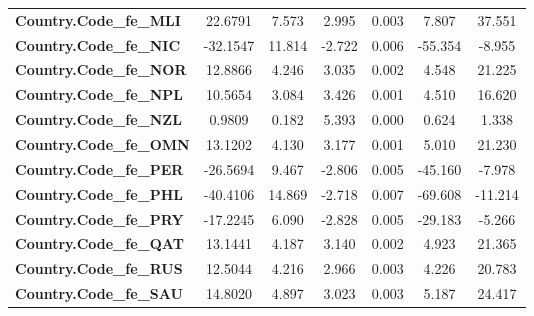 \begin{center}
\begin{tabular}{lcccccc}
\textbf{Country.Code\_fe\_MLI}                                     &      22.6791  &        7.573     &     2.995  &         0.003        &        7.807    &       37.551     \\
\textbf{Country.Code\_fe\_NIC}                                     &     -32.1547  &       11.814     &    -2.722  &         0.006        &      -55.354    &       -8.955     \\
\textbf{Country.Code\_fe\_NOR}                                     &      12.8866  &        4.246     &     3.035  &         0.002        &        4.548    &       21.225     \\
\textbf{Country.Code\_fe\_NPL}                                     &      10.5654  &        3.084     &     3.426  &         0.001        &        4.510    &       16.620     \\
\textbf{Country.Code\_fe\_NZL}                                     &       0.9809  &        0.182     &     5.393  &         0.000        &        0.624    &        1.338     \\
\textbf{Country.Code\_fe\_OMN}                                     &      13.1202  &        4.130     &     3.177  &         0.001        &        5.010    &       21.230     \\
\textbf{Country.Code\_fe\_PER}                                     &     -26.5694  &        9.467     &    -2.806  &         0.005        &      -45.160    &       -7.978     \\
\textbf{Country.Code\_fe\_PHL}                                     &     -40.4106  &       14.869     &    -2.718  &         0.007        &      -69.608    &      -11.214     \\
\textbf{Country.Code\_fe\_PRY}                                     &     -17.2245  &        6.090     &    -2.828  &         0.005        &      -29.183    &       -5.266     \\
\textbf{Country.Code\_fe\_QAT}                                     &      13.1441  &        4.187     &     3.140  &         0.002        &        4.923    &       21.365     \\
\textbf{Country.Code\_fe\_RUS}                                     &      12.5044  &        4.216     &     2.966  &         0.003        &        4.226    &       20.783     \\
\textbf{Country.Code\_fe\_SAU}                                     &      14.8020  &        4.897     &     3.023  &         0.003        &        5.187    &       24.417     \\

\end{tabular}
\end{center}

